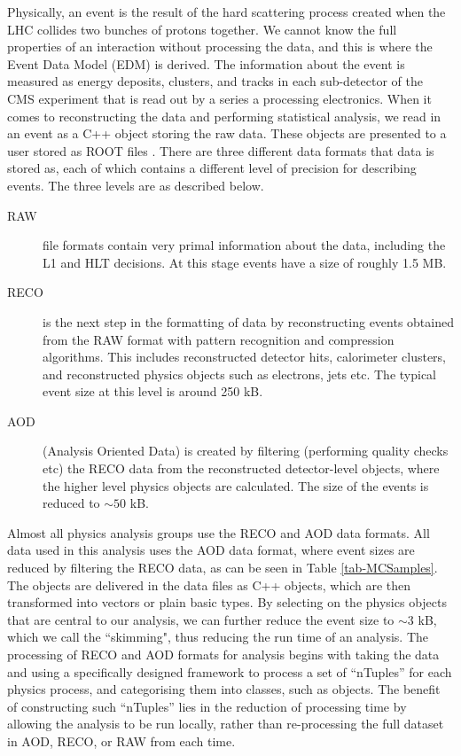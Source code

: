 Physically, an event is the result of the hard scattering process created when the LHC collides two bunches of protons together. We cannot know the full properties of an interaction without processing the data, and this is where the Event Data Model (EDM) is derived. The information about the event is measured as energy deposits, clusters, and tracks in each sub-detector of the CMS experiment that is read out by a series a processing electronics. When it comes to reconstructing the data and performing statistical analysis, we read in an event as a C++ object storing the raw data. These objects are presented to a user stored as ROOT files \cite{Brun199781}. There are three different data formats that data is stored as, each of which contains a different level of precision for describing events. The three levels are as described below.

\begin{description}
	\item[RAW] file formats contain very primal information about the data, including the L1 and HLT decisions. At this stage events have a size of roughly 1.5 MB. 
	\item[RECO] is the next step in the formatting of data by reconstructing events obtained from the RAW format with pattern recognition and compression algorithms. This includes reconstructed detector hits, calorimeter clusters, and reconstructed physics objects such as electrons, jets etc. The typical event size at this level is around 250 kB.
	\item[AOD] (Analysis Oriented Data) is created by filtering (performing quality checks etc) the RECO data from the reconstructed detector-level objects, where the higher level physics objects are calculated. The size of the events is reduced to $\sim50$ kB.	
\end{description}

Almost all physics analysis groups use the RECO and AOD data formats. All data used in this analysis uses the AOD data format, where event sizes are reduced by filtering the RECO data, as can be seen in Table \ref{tab-MCSamples}. The objects are delivered in the data files as C++ objects, which are then transformed into vectors or plain basic types. By selecting on the physics objects that are central to our analysis, we can further reduce the event size to $\sim$3 kB, which we call the ``skimming", thus reducing the run time of an analysis. The processing of RECO and AOD formats for analysis begins with taking the data and using a specifically designed framework to process a set of ``nTuples'' for each physics process, and categorising them into classes, such as objects. The benefit of constructing such ``nTuples'' lies in the reduction of processing time by allowing the analysis to be run locally, rather than re-processing the full dataset in AOD, RECO, or RAW from each time. 

